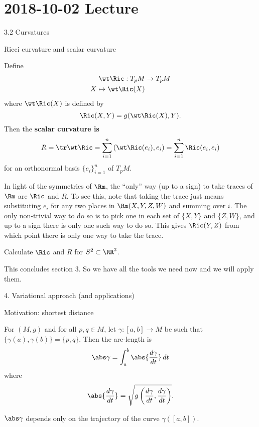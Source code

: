 \section{2018-10-02 Lecture}

3.2 Curvatures

Ricci curvature and scalar curvature

\begin{defn}
  Define
  \begin{align*}
    \wt\Ric: T_pM &\to T_pM \\
    X \mapsto \wt\Ric(X)
  \end{align*}
  where $\wt\Ric(X)$ is defined by
  \[ \Ric(X,Y) = g(\wt\Ric(X),Y). \]
  Then the \textbf{scalar curvature is}
  \[ R = \tr\wt\Ric = \sum_{i=1}^n \left( \wt\Ric(e_i),e_i \right) = \sum_{i=1}^n \Ric(e_i,e_i) \]
  for an orthonormal basis $\{e_i\}_{i=1}^n$ of $T_pM$.
\end{defn}

\begin{rmk}
  In light of the symmetries of $\Rm$, the ``only'' way (up to a sign) to take traces of $\Rm$ are $\Ric$ and $R$.
  To see this, note that taking the trace just means substituting $e_i$ for any two places in $\Rm(X,Y,Z,W)$ and summing over $i$.
  The only non-trivial way to do so is to pick one in each set of $\{X,Y\}$ and $\{Z,W\}$, and up to a sign there is only one such way to do so.
  This gives $\Ric(Y,Z)$ from which point there is only one way to take the trace.
\end{rmk}

\begin{exam}
  Calculate $\Ric$ and $R$ for $S^2 \subset \RR^3$.
\end{exam}

This concludes section 3.
So we have all the tools we need now and we will apply them.

4. Variational approach (and applications)

Motivation: shortest distance

For $(M,g)$ and for all $p,q\in M$, let $\gamma:[a,b]\to M$ be such that $\{\gamma(a),\gamma(b)\}=\{p,q\}$.
Then the arc-length is
\[ \abs\gamma = \int_a^b \abs{\frac{d\gamma}{dt}}\, dt \]
where
\[ \abs{\frac{d\gamma}{dt}} = \sqrt{g\left(\frac{d\gamma}{dt},\frac{d\gamma}{dt}\right)}. \]

\begin{prop}
  $\abs\gamma$ depends only on the trajectory of the curve $\gamma([a,b])$.
\end{prop}

